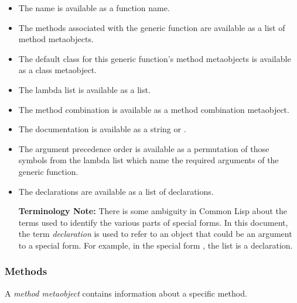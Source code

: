   \begin{itemize}
  \item 
    The name is available as a function name.

  \item 
    The methods associated with the generic function are available as a list of
    method metaobjects. 

  \item 
    The default class for this generic function's method metaobjects is
    available as a class metaobject. 

  \item 
    The lambda list is available as a list.

  \item 
    The method combination is available as a method combination metaobject. 

  \item 
    The documentation is available as a string or .

  \item 
    The argument precedence order is available as a permutation of those symbols
    from the lambda list which name the required arguments of the generic
    function. 

  \item 
    The declarations are available as a list of declarations.

    \textbf{Terminology Note:} There is some ambiguity in Common Lisp about the
      terms used to identify the various parts of  special forms. In this
      document, the term \emph{declaration} is used to refer to an object that could be
      an argument to a  special form. For example, in the special form
      , the list  is a declaration.
  \end{itemize}


\subsubsection{Methods}

A \emph{method metaobject} contains information about a specific method.


